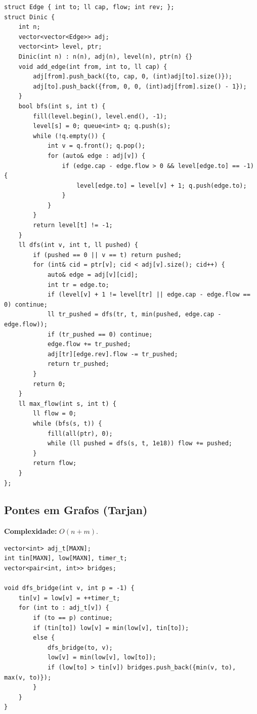 \begin{lstlisting}
struct Edge { int to; ll cap, flow; int rev; };
struct Dinic {
    int n;
    vector<vector<Edge>> adj;
    vector<int> level, ptr;
    Dinic(int n) : n(n), adj(n), level(n), ptr(n) {}
    void add_edge(int from, int to, ll cap) {
        adj[from].push_back({to, cap, 0, (int)adj[to].size()});
        adj[to].push_back({from, 0, 0, (int)adj[from].size() - 1});
    }
    bool bfs(int s, int t) {
        fill(level.begin(), level.end(), -1);
        level[s] = 0; queue<int> q; q.push(s);
        while (!q.empty()) {
            int v = q.front(); q.pop();
            for (auto& edge : adj[v]) {
                if (edge.cap - edge.flow > 0 && level[edge.to] == -1) {
                    level[edge.to] = level[v] + 1; q.push(edge.to);
                }
            }
        }
        return level[t] != -1;
    }
    ll dfs(int v, int t, ll pushed) {
        if (pushed == 0 || v == t) return pushed;
        for (int& cid = ptr[v]; cid < adj[v].size(); cid++) {
            auto& edge = adj[v][cid];
            int tr = edge.to;
            if (level[v] + 1 != level[tr] || edge.cap - edge.flow == 0) continue;
            ll tr_pushed = dfs(tr, t, min(pushed, edge.cap - edge.flow));
            if (tr_pushed == 0) continue;
            edge.flow += tr_pushed;
            adj[tr][edge.rev].flow -= tr_pushed;
            return tr_pushed;
        }
        return 0;
    }
    ll max_flow(int s, int t) {
        ll flow = 0;
        while (bfs(s, t)) {
            fill(all(ptr), 0);
            while (ll pushed = dfs(s, t, 1e18)) flow += pushed;
        }
        return flow;
    }
};
\end{lstlisting}


\subsection{Pontes em Grafos (Tarjan)}

\textbf{Complexidade:} $O(n + m)$.

\begin{lstlisting}
vector<int> adj_t[MAXN];
int tin[MAXN], low[MAXN], timer_t;
vector<pair<int, int>> bridges;

void dfs_bridge(int v, int p = -1) {
    tin[v] = low[v] = ++timer_t;
    for (int to : adj_t[v]) {
        if (to == p) continue;
        if (tin[to]) low[v] = min(low[v], tin[to]);
        else {
            dfs_bridge(to, v);
            low[v] = min(low[v], low[to]);
            if (low[to] > tin[v]) bridges.push_back({min(v, to), max(v, to)});
        }
    }
}
\end{lstlisting}


